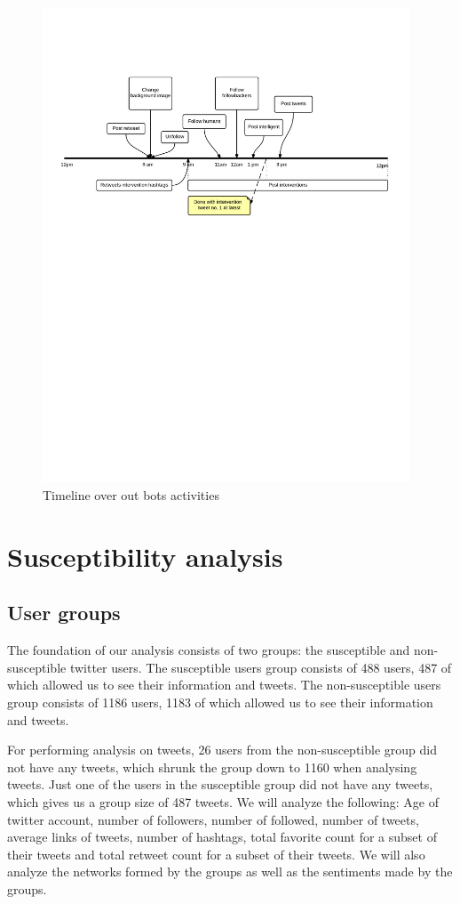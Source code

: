 \documentclass[10pt]{IEEEtran}
\begin{document}
\begin{figure}[H]
  \centering
 \hspace*{-1.8cm}\includegraphics[trim=0.5cm 15cm 0.5cm 4cm,width=4.3in]{intervention_timeline}
  \caption{Timeline over out bots activities}
  \label{fig:bot}
\end{figure}

\section{Susceptibility analysis}
\subsection{User groups}
The foundation of our analysis consists of two groups: the susceptible and non-susceptible twitter users. The susceptible users group consists of 488 users, 487 of which allowed us to see their information and tweets. The non-susceptible users group consists of 1186 users, 1183 of which allowed us to see their information and tweets.

For performing analysis on tweets, 26 users from the non-susceptible group did not have any tweets, which shrunk the group down to 1160 when analysing tweets. Just one of the users in the susceptible group did not have any tweets, which gives us a group size of 487 tweets.
We will analyze the following: Age of twitter account, number of followers, number of followed, number of tweets, average links of tweets, number of hashtags, total favorite count for a subset of their tweets and total retweet count for a subset of their tweets. We will also analyze the networks formed by the groups as well as the sentiments made by the groups.
\end{document}
